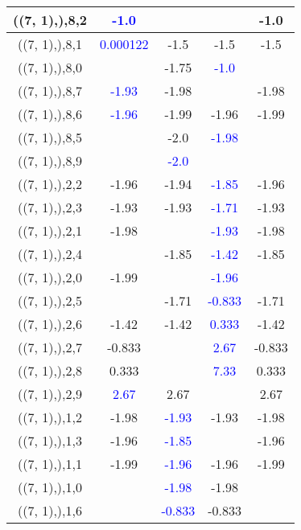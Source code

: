 \documentclass{article}
\begin{document}
\begin{center}
\begin{longtable}{|c|c|c|c|c|}
        	((7, 1),),8,2& \textcolor{blue}{-1.0}&&&-1.0\\
        	\hline
        	((7, 1),),8,1& \textcolor{blue}{0.000122}&-1.5&-1.5&-1.5\\
        	\hline
        	((7, 1),),8,0&&-1.75& \textcolor{blue}{-1.0}&\\
        	\hline
        	((7, 1),),8,7& \textcolor{blue}{-1.93}&-1.98&&-1.98\\
        	\hline
        	((7, 1),),8,6& \textcolor{blue}{-1.96}&-1.99&-1.96&-1.99\\
        	\hline
        	((7, 1),),8,5&&-2.0& \textcolor{blue}{-1.98}&\\
        	\hline
        	((7, 1),),8,9&& \textcolor{blue}{-2.0}&&\\
        	\hline
        	((7, 1),),2,2&-1.96&-1.94& \textcolor{blue}{-1.85}&-1.96\\
        	\hline
        	((7, 1),),2,3&-1.93&-1.93& \textcolor{blue}{-1.71}&-1.93\\
        	\hline
        	((7, 1),),2,1&-1.98&& \textcolor{blue}{-1.93}&-1.98\\
        	\hline
        	((7, 1),),2,4&&-1.85& \textcolor{blue}{-1.42}&-1.85\\
        	\hline
        	((7, 1),),2,0&-1.99&& \textcolor{blue}{-1.96}&\\
        	\hline
        	((7, 1),),2,5&&-1.71& \textcolor{blue}{-0.833}&-1.71\\
        	\hline
        	((7, 1),),2,6&-1.42&-1.42& \textcolor{blue}{0.333}&-1.42\\
        	\hline
        	((7, 1),),2,7&-0.833&& \textcolor{blue}{2.67}&-0.833\\
        	\hline
        	((7, 1),),2,8&0.333&& \textcolor{blue}{7.33}&0.333\\
        	\hline
        	((7, 1),),2,9& \textcolor{blue}{2.67}&2.67&&2.67\\
        	\hline
        	((7, 1),),1,2&-1.98& \textcolor{blue}{-1.93}&-1.93&-1.98\\
        	\hline
        	((7, 1),),1,3&-1.96& \textcolor{blue}{-1.85}&&-1.96\\
        	\hline
        	((7, 1),),1,1&-1.99& \textcolor{blue}{-1.96}&-1.96&-1.99\\
        	\hline
        	((7, 1),),1,0&& \textcolor{blue}{-1.98}&-1.98&\\
        	\hline
        	((7, 1),),1,6&& \textcolor{blue}{-0.833}&-0.833&\\
        	\hline

\end{longtable}
\end{center}
\end{document}
